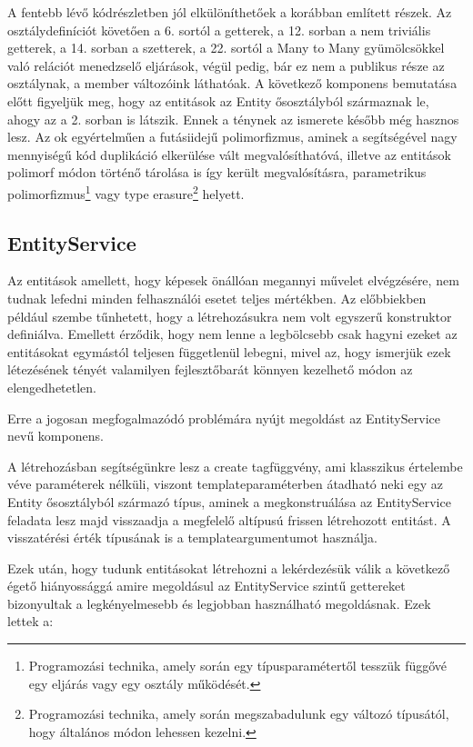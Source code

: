 A fentebb lévő kódrészletben jól elkülöníthetőek a korábban említett részek. Az osztálydefiníciót követően a 6. sortól a getterek, a 12. sorban a nem triviális getterek, a 14. sorban a szetterek, a 22. sortól a Many to Many gyümölcsökkel való relációt menedzselő eljárások, végül pedig, bár ez nem a publikus része az osztálynak, a member változóink láthatóak.
A következő komponens bemutatása előtt figyeljük meg, hogy az entitások az Entity ősosztályból származnak le, ahogy az a 2. sorban is látszik. Ennek a ténynek az ismerete később még hasznos lesz. Az ok egyértelműen a futásiidejű polimorfizmus, aminek a segítségével nagy mennyiségű kód duplikáció elkerülése vált megvalósíthatóvá, illetve az entitások polimorf módon történő tárolása is így került megvalósításra, parametrikus polimorfizmus\footnote{Programozási technika, amely során egy típusparamétertől tesszük függővé egy eljárás vagy egy osztály működését.} vagy type erasure\footnote{Programozási technika, amely során megszabadulunk egy változó típusától, hogy általános módon lehessen kezelni.} helyett.

\subsection{EntityService}

Az entitások amellett, hogy képesek önállóan megannyi művelet elvégzésére, nem tudnak lefedni minden felhasználói esetet teljes mértékben. Az előbbiekben például szembe tűnhetett, hogy a létrehozásukra nem volt egyszerű konstruktor definiálva. Emellett érződik, hogy nem lenne a legbölcsebb csak hagyni ezeket az entitásokat egymástól teljesen függetlenül lebegni, mivel az, hogy ismerjük ezek létezésének tényét valamilyen fejlesztőbarát könnyen kezelhető módon az elengedhetetlen.

Erre a jogosan megfogalmazódó problémára nyújt megoldást az EntityService nevű komponens.

A létrehozásban segítségünkre lesz a create tagfüggvény, ami klasszikus értelembe véve paraméterek nélküli, viszont templateparaméterben átadható neki egy az Entity ősosztályból származó típus, aminek a megkonstruálása az EntityService feladata lesz majd visszaadja a megfelelő altípusú frissen létrehozott entitást. A visszatérési érték típusának is a templateargumentumot használja.

Ezek után, hogy tudunk entitásokat létrehozni a lekérdezésük válik a következő égető hiányossággá amire megoldásul az EntityService szintű gettereket bizonyultak a legkényelmesebb és legjobban használható megoldásnak. Ezek lettek a:


